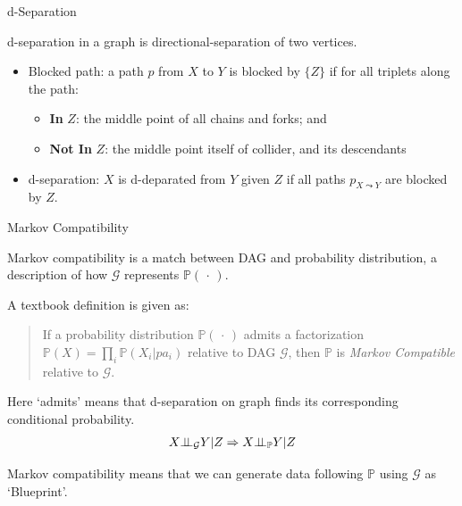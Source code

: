 \begin{point}
    d-Separation
\end{point}

d-separation in a graph is directional-separation of two vertices.

\begin{itemize}[topsep=2pt,itemsep=0pt]
    \item Blocked path: a path $ p $ from $ X $ to $ Y $ is blocked by $ \{Z\} $ if for all triplets along the path:
    \begin{itemize}[topsep=2pt,itemsep=0pt]
        \item \textbf{In} $ Z $: the middle point of all chains and forks; and
        \item \textbf{Not In} $ Z $: the middle point itself of collider, and its descendants
    \end{itemize}
    \item d-separation: $ X $ is d-deparated from $ Y $ given $ Z $ if all paths $ p_{X\leadsto Y} $ are blocked by $ Z $.
        
\end{itemize}

    

\begin{point}
    Markov Compatibility
\end{point}

Markov compatibility is a match between DAG and probability distribution, a description of how $ \mathcal{G} $ represents $ \mathbb{P}\left( \, \cdot \,  \right)  $.

A textbook definition is given as:
\begin{quote}
    If a probability distribution $ \mathbb{P}\left( \, \cdot \,  \right)  $ admits a factorization $ \mathbb{P}\left( X \right) = \prod_{i}\mathbb{P}\left( X_i|pa_i \right)  $ relative to DAG $ \mathcal{G} $, then $ \mathbb{P} $ is \textit{Markov Compatible} relative to $ \mathcal{G} $.
\end{quote}

Here `admits' means that d-separation on graph finds its corresponding conditional probability.
\begin{align}
    X\bot\!\!\!\bot _\mathcal{G} Y|Z\Rightarrow  X\bot\!\!\!\bot _\mathbb{P} Y|Z
\end{align}

Markov compatibility means that we can generate data following $ \mathbb{P} $ using $ \mathcal{G} $ as `Blueprint'.

